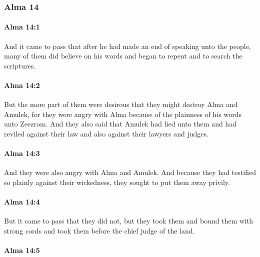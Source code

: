 	\subsubsection{Alma 14} %
		\label{ALMA-14}
		
		\paragraph{Alma 14:1} %
			\label{ALMA-14-1}

			And it came to pass that
			after he had made an end of speaking unto the people,
			many of them did believe on his words
			and began to repent and to search the scriptures.

		\paragraph{Alma 14:2} %
			\label{ALMA-14-2}

			But the more part of them were desirous
			that they might destroy Alma and Amulek,
			for they were angry with Alma
			because of the plainness of his words unto Zeezrom.
			And they also said that Amulek had lied unto them
			and had reviled against their law and also against their lawyers and judges.

		\paragraph{Alma 14:3} %
			\label{ALMA-14-3}

			And they were also angry with Alma and Amulek.
			And because they had testified so plainly against their wickedness,
			they sought to put them away privily.

		\paragraph{Alma 14:4} %
			\label{ALMA-14-4}

			But it came to pass that they did not,
			but they took them and bound them with strong cords
			and took them before the chief judge of the land.

		\paragraph{Alma 14:5} %
			\label{ALMA-14-5}


